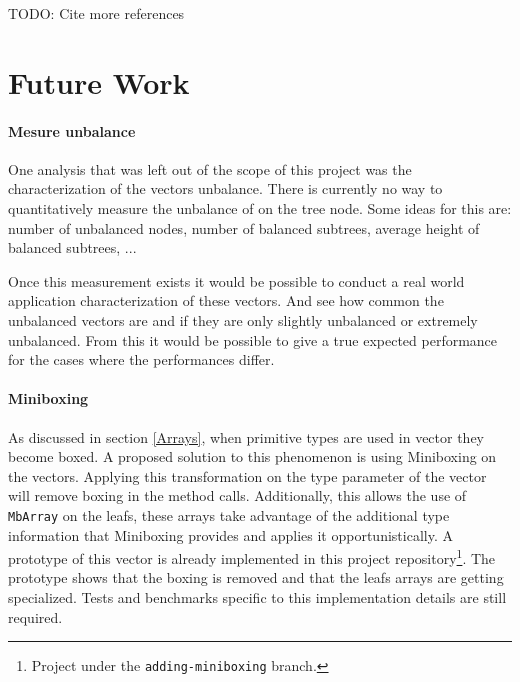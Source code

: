 \color{red} TODO: Cite more references \color{black}



\section{Future Work}

\paragraph{Mesure unbalance}
One analysis that was left out of the scope of this project was the characterization of the vectors unbalance. There is currently no way to quantitatively measure the unbalance of on the tree node. Some ideas for this are: number of unbalanced nodes, number of balanced subtrees, average height of balanced subtrees, ... 

Once this measurement exists it would be possible to conduct a real world application characterization of these vectors. And see how common the unbalanced vectors are and if they are only slightly unbalanced or extremely unbalanced. From this it would be possible to give a true expected performance for the cases where the performances differ.

\paragraph{Miniboxing}
As discussed in section \ref{Arrays}, when primitive types are used in vector they become boxed. A proposed solution to this phenomenon is using Miniboxing \cite{Ureche:2013:MIS:2509136.2509537,  EPFL-REPORT-200245} on the vectors. Applying this transformation on the type parameter of the vector will remove boxing in the method calls. Additionally, this allows the use of \texttt{MbArray} on the leafs, these arrays take advantage of the additional type information that Miniboxing provides and applies it opportunistically. A prototype of this vector is already implemented in this project repository\footnote{Project \cite{projecRepo} under the \texttt{adding-miniboxing} branch.}. The prototype shows that the boxing is removed and that the leafs arrays are getting specialized. Tests and benchmarks specific to this implementation details are still required.


